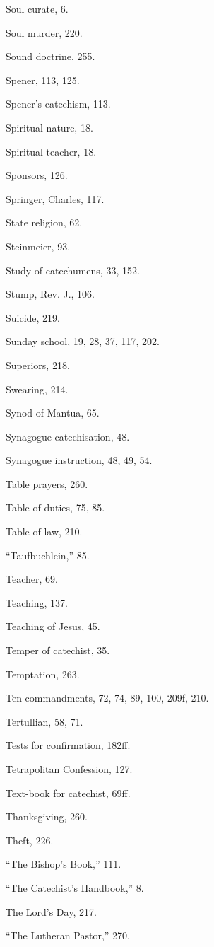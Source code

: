 \begin{originalinhalt}
Soul curate, 6.

Soul murder, 220.

Sound doctrine, 255.

Spener, 113, 125.

Spener’s catechism, 113.

Spiritual nature, 18.

Spiritual teacher, 18.

Sponsors, 126.

Springer, Charles, 117.

State religion, 62.

Steinmeier, 93.

Study of catechumens, 33, 152.

Stump, Rev. J., 106.

Suicide, 219.

Sunday school, 19, 28, 37, 117, 202.

Superiors, 218.

Swearing, 214.

Synod of Mantua, 65.

Synagogue catechisation, 48.

Synagogue instruction, 48, 49, 54.


Table prayers, 260.

Table of duties, 75, 85.

Table of law, 210.

“Taufbuchlein,” 85.

Teacher, 69.

Teaching, 137.

Teaching of Jesus, 45.

Temper of catechist, 35.

Temptation, 263.

Ten commandments, 72, 74, 89, 100, 209f, 210.

Tertullian, 58, 71.

Tests for confirmation, 182ff.

Tetrapolitan Confession, 127.

Text-book for catechist, 69ff.

Thanksgiving, 260.

Theft, 226.

“The Bishop’s Book,” 111.

“The Catechist’s Handbook,” 8.

The Lord’s Day, 217.

“The Lutheran Pastor,” 270.


\end{originalinhalt}

